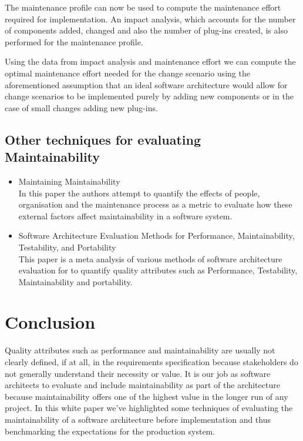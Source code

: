 \documentclass[15pt]{article}
\begin{document}
The maintenance profile can now be used to compute the maintenance effort required for implementation. An impact analysis, which accounts for the number of components added, changed and also the number of plug-ins created, is also performed for the maintenance profile. 

Using the data from impact analysis and maintenance effort we can compute the optimal maintenance effort needed for the change scenario using the aforementioned assumption that an ideal software architecture would allow for change scenarios to be implemented purely by adding new components or in the case of small changes adding new plug-ins. 


\subsection{Other techniques for evaluating Maintainability}

\begin{itemize}
\item Maintaining Maintainability \cite{ramage_maintaining_1998}\\
In this paper the authors attempt to quantify the effects of people, organisation and the maintenance process as a metric to evaluate how these external factors affect maintainability in a software system.

\item Software Architecture Evaluation Methods for Performance, Maintainability, Testability, and Portability \cite{mattsson_software_2006}\\
This paper is a meta analysis of various methods of software architecture evaluation for to quantify quality attributes such as Performance, Testability, Maintainability and portability.


\end{itemize}

\section{Conclusion}
Quality attributes such as performance and maintainability are usually not clearly defined, if at all, in the requirements specification because stakeholders do not generally understand their necessity or value. It is our job as software architects to evaluate and include maintainability as part of the architecture because maintainability offers one of the highest value in the longer run of any project. In this white paper we've highlighted some techniques of evaluating the maintainability of a software architecture before implementation and thus benchmarking the expectations for the production system.


\newpage


\end{document}
